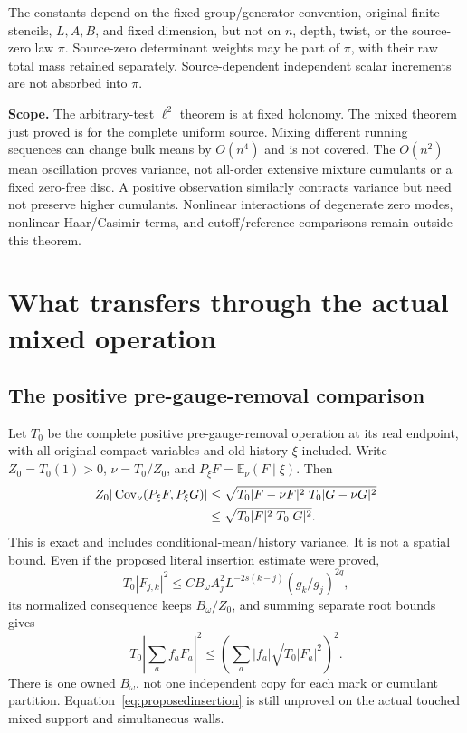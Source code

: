 \documentclass[11pt,letterpaper]{article}
\theoremstyle{remark}\newtheorem{remark}[theorem]{Remark}
\newcommand{\E}{\mathbb E}
\begin{document}
The constants depend on the fixed group/generator convention, original finite stencils, \(L,A,B\), and fixed dimension, but not on \(n\), depth, twist, or the source-zero law \(\pi\). Source-zero determinant weights may be part of \(\pi\), with their raw total mass retained separately. Source-dependent independent scalar increments are not absorbed into \(\pi\).

\textbf{Scope.} The arbitrary-test \(\ell^2\) theorem is at fixed holonomy. The mixed theorem just proved is for the complete uniform source. Mixing different running sequences can change bulk means by \(O(n^4)\) and is not covered. The \(O(n^2)\) mean oscillation proves variance, not all-order extensive mixture cumulants or a fixed zero-free disc. A positive observation similarly contracts variance but need not preserve higher cumulants. Nonlinear interactions of degenerate zero modes, nonlinear Haar/Casimir terms, and cutoff/reference comparisons remain outside this theorem.

\section{What transfers through the actual mixed operation}

\subsection{The positive pre-gauge-removal comparison}

Let \(T_0\) be the complete positive pre-gauge-removal operation at its real endpoint, with all original compact variables and old history \(\xi\) included. Write \(Z_0=T_0(1)>0\), \(\nu=T_0/Z_0\), and \(P_\xi F=\E_\nu(F\mid\xi)\). Then
\begin{align}\label{eq:T0}
 Z_0|\operatorname{Cov}_\nu(P_\xi F,P_\xi G)|
 &\le\sqrt{T_0|F-\nu F|^2\;T_0|G-\nu G|^2}\\
 &\le\sqrt{T_0|F|^2\;T_0|G|^2}.\nonumber
\end{align}
This is exact and includes conditional-mean/history variance. It is not a spatial bound. Even if the proposed literal insertion estimate were proved,
\begin{equation}\label{eq:proposedinsertion}
 T_0|F_{j,k}|^2\le CB_\omega A_j^2
 L^{-2s(k-j)}(g_k/g_j)^{2q},
\end{equation}
its normalized consequence keeps \(B_\omega/Z_0\), and summing separate root bounds gives
\[
 T_0\left|\sum_a f_aF_a\right|^2
 \le\left(\sum_a|f_a|\sqrt{T_0|F_a|^2}\right)^2.
\]
There is one owned \(B_\omega\), not one independent copy for each mark or cumulant partition. Equation~\eqref{eq:proposedinsertion} is still unproved on the actual touched mixed support and simultaneous walls.
\end{document}
